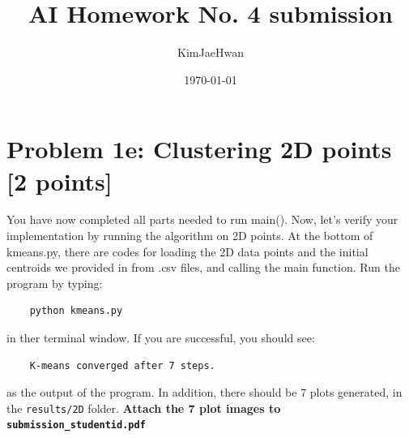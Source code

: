 \documentclass[a4paper]{article}
\title{AI Homework No. 4 submission}
\author{KimJaeHwan}
\date{\today}
\begin{document}
\maketitle

\section*{Problem 1e: Clustering 2D points [2 points]}
You have now completed all parts needed to run main(). Now, let’s verify your implementation by running the algorithm on 2D points. At the bottom of kmeans.py, there are codes for loading the 2D data points and the initial centroids we provided in from .csv files, and calling the main function. Run the program by typing:

\begin{verbatim}
    python kmeans.py
\end{verbatim}

\noindent
in ther terminal window. If you are successful, you should see:

\begin{verbatim}
    K-means converged after 7 steps.
\end{verbatim}

\noindent
as the output of the program. In addition, there should be 7 plots generated, in the \texttt{results/2D} folder. \textbf{Attach the 7 plot images to \texttt{submission\_studentid.pdf}}
\end{document}
